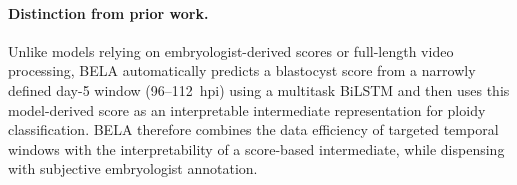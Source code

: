 \paragraph{Distinction from prior work.}
Unlike models relying on embryologist-derived scores or full-length video processing, BELA automatically predicts a blastocyst score from a narrowly defined day-5 window (96--112~hpi) using a multitask BiLSTM and then uses this model-derived score as an interpretable intermediate representation for ploidy classification. BELA therefore combines the data efficiency of targeted temporal windows with the interpretability of a score-based intermediate, while dispensing with subjective embryologist annotation.
